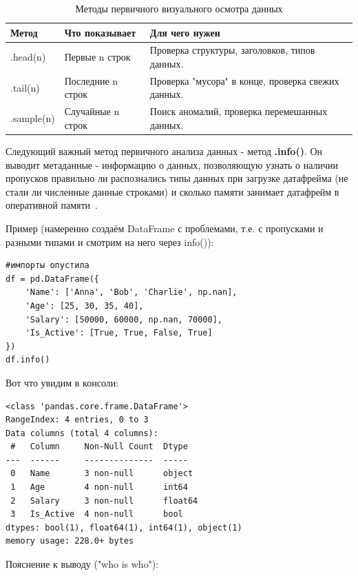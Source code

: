 \documentclass[pract]{SCWorks}
\begin{document}
\begin{table}[H]
\centering
\caption{Методы первичного визуального осмотра данных}
\begin{tabular}{|p{2.5cm}|p{4cm}|p{6cm}|}
\hline
\textbf{Метод} & \textbf{Что показывает} & \textbf{Для чего нужен} \\ \hline
.head(n) & Первые n строк & Проверка структуры, заголовков, типов данных. \\ \hline
.tail(n) & Последние n строк & Проверка "мусора" в конце, проверка свежих данных. \\ \hline
.sample(n) & Случайные n строк & Поиск аномалий, проверка перемешанных данных. \\ \hline
\end{tabular}
\label{tab:eda_head_tail_sample}
\end{table}

Следующий важный метод первичного анализа данных - метод \textbf{.info()}. Он выводит метаданные - информацию о данных, позволяющую узнать о наличии пропусков
правильно ли распознались типы данных при загрузке датафрейма (не стали ли численные данные строками) и
сколько памяти занимает датафрейм в оперативной памяти~\cite{pandas-docs}.

Пример (намеренно создаём DataFrame с проблемами, т.е. с пропусками и разными типами и смотрим на него через info()):

\begin{verbatim}
#импорты опустила
df = pd.DataFrame({
    'Name': ['Anna', 'Bob', 'Charlie', np.nan],
    'Age': [25, 30, 35, 40],
    'Salary': [50000, 60000, np.nan, 70000],
    'Is_Active': [True, True, False, True]
})
df.info()
\end{verbatim}

Вот что увидим в консоли:

\begin{verbatim}
<class 'pandas.core.frame.DataFrame'>
RangeIndex: 4 entries, 0 to 3
Data columns (total 4 columns):
 #   Column     Non-Null Count  Dtype  
---  ------     --------------  -----  
 0   Name       3 non-null      object 
 1   Age        4 non-null      int64  
 2   Salary     3 non-null      float64
 3   Is_Active  4 non-null      bool   
dtypes: bool(1), float64(1), int64(1), object(1)
memory usage: 228.0+ bytes
\end{verbatim}

Пояснение к выводу ("who is who"):
\end{document}
